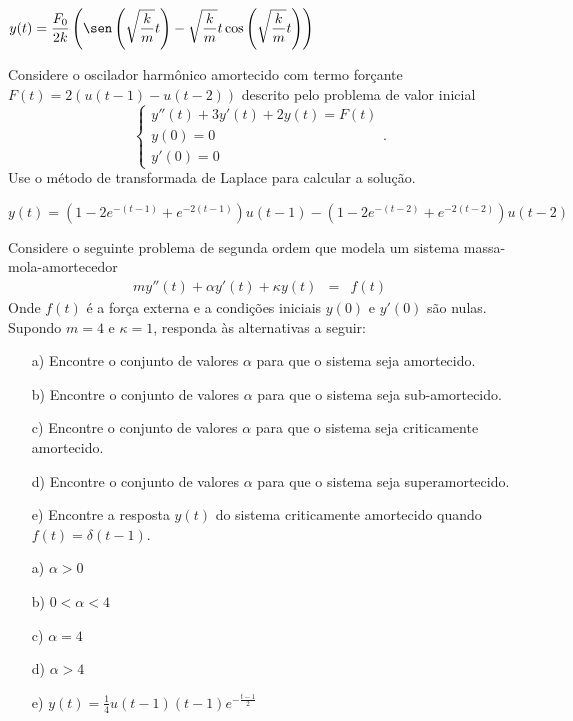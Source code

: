 \begin{resp}
$\displaystyle y(t)=\frac{F_0}{2k}\left(\sen\left(\sqrt{\frac{k}{m}}t\right)-\sqrt{\frac{k}{m}}t\cos\left(\sqrt{\frac{k}{m}}t\right)\right)$
\end{resp}


\begin{exer}Considere o oscilador harmônico amortecido com termo forçante $F(t)=2(u(t-1)-u(t-2))$ descrito pelo problema de valor inicial
\begin{equation}\left\{
\begin{array}{l}
 y''(t)+3y'(t)+2y(t)=F(t)\\
 y(0)=0\\
 y'(0)=0
\end{array}
\right..
\end{equation}
Use o método de transformada de Laplace para calcular a solução.
\end{exer}
\begin{resp}
$\displaystyle y(t)=(1-2e^{-(t-1)}+e^{-2(t-1)})u(t-1)-(1-2e^{-(t-2)}+e^{-2(t-2)})u(t-2)$
\end{resp}
\begin{exer}
 Considere o seguinte problema de segunda ordem que modela um sistema massa-mola-amortecedor
\begin{eqnarray*}
 m y''(t) +\alpha y'(t) + \kappa y(t) &=& f(t)
 \end{eqnarray*}
Onde $f(t)$ é a força externa e a condições iniciais $y(0)$ e $y'(0)$ são nulas.
 Supondo $m=4$ e $\kappa=1$, responda às alternativas a seguir:
 \begin{itemize}
  \item [a)] Encontre o conjunto de valores $\alpha$ para que o sistema seja amortecido.
  \item [b)] Encontre o conjunto de valores $\alpha$ para que o sistema seja sub-amortecido.
  \item [c)] Encontre o conjunto de valores $\alpha$ para que o sistema seja criticamente amortecido.
  \item [d)] Encontre o conjunto de valores $\alpha$ para que o sistema seja superamortecido.
  \item [e)] Encontre a resposta $y(t)$ do sistema criticamente amortecido quando $f(t)=\delta(t-1)$.
 \end{itemize}
\end{exer}
\begin{resp}
 \begin{itemize}
  \item [a)] $\alpha>0$
  \item [b)] $0<\alpha<4$
  \item [c)] $\alpha=4$
  \item [d)] $\alpha>4$
  \item [e)] $y(t)=\frac{1}{4} u(t-1) (t-1) e^{-\frac{t-1}{2}}$
 \end{itemize}
\end{resp}

